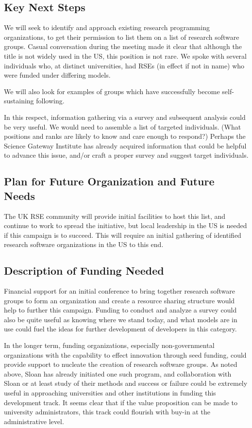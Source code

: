 \subsection{Key Next Steps}

We will seek to identify and approach existing research programming organizations,
to get their permission to list them on a list of research software groups.
Casual conversation during the meeting made it clear that although the title is
not widely used in the US, this position is not rare. We spoke with several
individuals who, at distinct universities, had RSEs (in effect if not in name)
who were funded under differing models.

We will also look for examples of groups which have successfully become self-
sustaining following. 

In this respect, information gathering via a survey and subsequent analysis could be
very useful. We would need to assemble a list of targeted individuals. (What
positions and ranks are likely to know and care enough to respond?) Perhaps the
Science Gateway Institute has already acquired information that could be helpful
to advance this issue, and/or craft a proper survey and suggest target individuals.

\subsection{Plan for Future Organization and Future Needs}

The UK RSE community will provide initial facilities to host this list, and
continue to work to spread the initiative, but local leadership in the US is
needed if this campaign is to succeed. This will require an initial gathering of
identified research software organizations in the US to this end.

\subsection{Description of Funding Needed}

Financial support for an initial conference to bring together research software
groups to form an organization and create a resource sharing structure would
help to further this campaign. Funding to conduct and analyze a survey could
also be quite useful as knowing where we stand today, and what models are in use
could fuel the ideas for further development of developers in this category.

In the longer term, funding organizations, especially non-governmental
organizations with the capability to effect innovation through seed funding,
could provide support to nucleate the creation of research software groups. As
noted above, Sloan has already initiated one such program, and collaboration
with Sloan or at least study of their methods and success or failure could be
extremely useful in approaching universities and other institutions in funding
this development track. It seems clear that if the value proposition can be made
to university administrators, this track could flourish with buy-in at the
administrative level.

